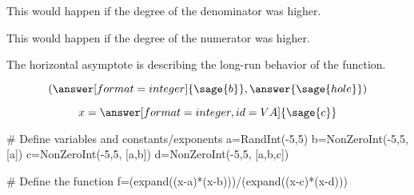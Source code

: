 {\begin{problem}
\begin{problem}
\begin{problem}
\begin{feedback}[HA=0]
This would happen if the degree of the denominator was higher.
\end{feedback}

\begin{feedback}[HA>1]
This would happen if the degree of the numerator was higher.
\end{feedback}

\begin{feedback}[correct]
The horizontal asymptote is describing the long-run behavior of the function.
\end{feedback}


\end{problem}

\[(\answer[format=integer]{\sage{b}}, \answer{\sage{hole}})\]

\end{problem}

\[x=\answer[format=integer,id=VA]{\sage{c}}\]

\end{problem}}%

\begin{sagesilent}
# Define variables and constants/exponents
a=RandInt(-5,5)
b=NonZeroInt(-5,5, [a])
c=NonZeroInt(-5,5, [a,b])
d=NonZeroInt(-5,5, [a,b,c])

# Define the function
f=(expand((x-a)*(x-b)))/(expand((x-c)*(x-d)))

\end{sagesilent}
 
